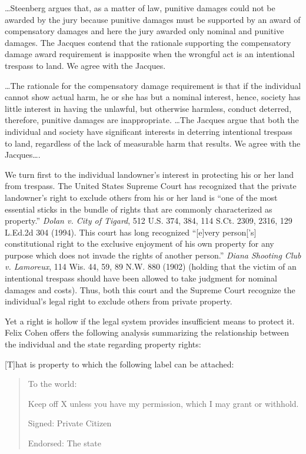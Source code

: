 
\ldots Steenberg argues that, as a matter of law, punitive damages could not be
awarded by the jury because punitive damages must be supported by an award of
compensatory damages and here the jury awarded only nominal and punitive
damages. The Jacques contend that the rationale supporting the compensatory
damage award requirement is inapposite when the wrongful act is an intentional
trespass to land. We agree with the Jacques.

\ldots The rationale for the compensatory damage requirement is that if the
individual cannot show actual harm, he or she has but a nominal interest,
hence, society has little interest in having the unlawful, but otherwise
harmless, conduct deterred, therefore, punitive damages are inappropriate.
\ldots The Jacques argue that both the individual and society have significant
interests in deterring intentional trespass to land, regardless of the lack of
measurable harm that results. We agree with the Jacques\ldots.

We turn first to the individual landowner's interest in protecting his or her
land from trespass. The United States Supreme Court has recognized that the
private landowner's right to exclude others from his or her land is ``one of
the most essential sticks in the bundle of rights that are commonly
characterized as property.'' \textit{Dolan v. City of Tigard}, 512 U.S. 374,
384, 114 S.Ct. 2309, 2316, 129 L.Ed.2d 304 (1994). This court has long
recognized ``[e]very person['s] constitutional right to the exclusive enjoyment
of his own property for any purpose which does not invade the rights of another
person.'' \textit{Diana Shooting Club v. Lamoreux}, 114 Wis. 44, 59, 89 N.W.
880 (1902) (holding that the victim of an intentional trespass should have been
allowed to take judgment for nominal damages and costs). Thus, both this court
and the Supreme Court recognize the individual's legal right to exclude others
from private property.

Yet a right is hollow if the legal system provides insufficient means to protect
it. Felix Cohen offers the following analysis summarizing the relationship
between the individual and the state regarding property rights:

[T]hat is property to which the following label can be attached:

\begin{quotation}
To the world:

Keep off X unless you have my permission, which I may grant or withhold.

Signed: Private Citizen

Endorsed: The state
\end{quotation}

